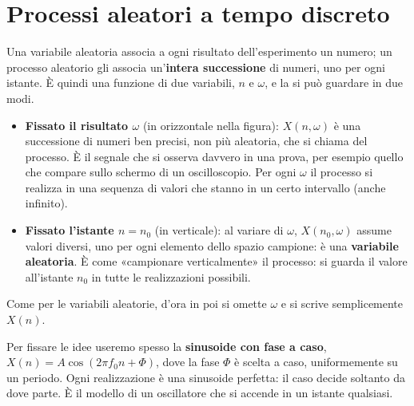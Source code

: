 \section{Processi aleatori a tempo discreto}


Una variabile aleatoria associa a ogni risultato dell'esperimento un numero; un processo aleatorio gli associa
un'\textbf{intera successione} di numeri, uno per ogni istante. È quindi una funzione di due variabili, $n$ e $\omega$,
e la si può guardare in due modi.
\begin{itemize}
  \item \textbf{Fissato il risultato $\omega$} (in orizzontale nella figura): $X(n, \omega)$ è una successione di numeri
        ben precisi, non più aleatoria, che si chiama  del processo. È il segnale che si osserva
        davvero in una prova, per esempio quello che compare sullo schermo di un oscilloscopio. Per ogni $\omega$ il
        processo si realizza in una sequenza di valori che stanno in un certo intervallo (anche infinito).
  \item \textbf{Fissato l'istante $n = n_0$} (in verticale): al variare di $\omega$, $X(n_0, \omega)$ assume valori
        diversi, uno per ogni elemento dello spazio campione: è una \textbf{variabile aleatoria}. È come «campionare
        verticalmente» il processo: si guarda il valore all'istante $n_0$ in tutte le realizzazioni possibili.
\end{itemize}
Come per le variabili aleatorie, d'ora in poi si omette $\omega$ e si scrive semplicemente $X(n)$.

Per fissare le idee useremo spesso la \textbf{sinusoide con fase a caso}, $X(n) = A\cos(2\pi f_0 n + \Phi)$, dove la
fase $\Phi$ è scelta a caso, uniformemente su un periodo. Ogni realizzazione è una sinusoide perfetta: il caso decide
soltanto da dove parte. È il modello di un oscillatore che si accende in un istante qualsiasi.

